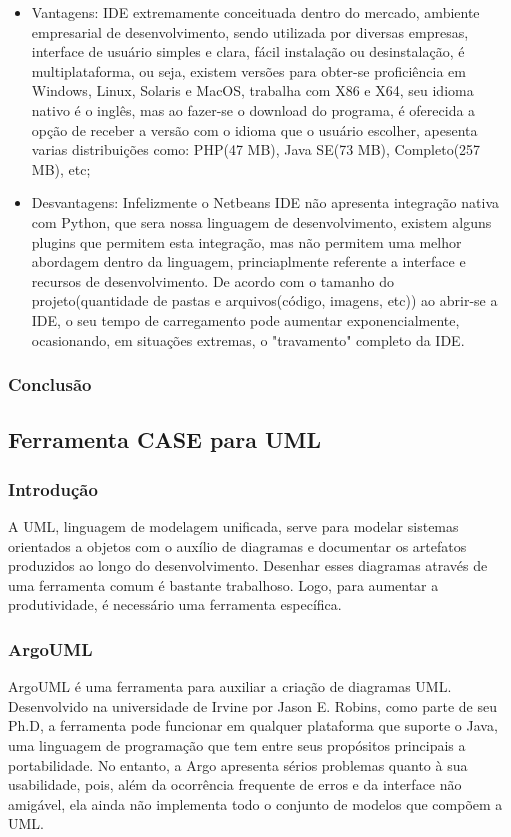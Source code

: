 \documentclass[12pt,a4paper]{article}
\begin{document}
			\begin{itemize}
				\item Vantagens:
				IDE extremamente conceituada dentro do mercado, ambiente empresarial de desenvolvimento, sendo utilizada por diversas empresas, interface de usuário simples e clara, fácil instalação ou desinstalação, é multiplataforma, ou seja, existem versões para obter-se proficiência em Windows, Linux, Solaris e MacOS, trabalha com X86 e X64, seu idioma nativo é o inglês, mas ao fazer-se o download do programa, é oferecida a opção de receber a versão com o idioma que o usuário escolher, apesenta varias distribuições como: PHP(47 MB), Java SE(73 MB), Completo(257 MB), etc;
				\item Desvantagens:
				 Infelizmente o Netbeans IDE não apresenta integração nativa com Python, que sera nossa linguagem de desenvolvimento, existem alguns plugins que permitem esta integração, mas não permitem uma melhor abordagem dentro da linguagem, princiaplmente referente a interface e recursos de desenvolvimento. 
				 De acordo com o tamanho do projeto(quantidade de pastas e arquivos(código, imagens, etc)) ao abrir-se a IDE, o seu tempo de carregamento pode aumentar exponencialmente, ocasionando, em situações extremas, o "travamento" completo da IDE.
			\end{itemize}
		
		\subsubsection{Conclusão}

	\clearpage
	\subsection{Ferramenta CASE para UML}
		\subsubsection{Introdução}
			A UML, linguagem de modelagem unificada, serve para modelar sistemas orientados
			a objetos com o auxílio de diagramas e documentar os artefatos
			produzidos ao longo do desenvolvimento. Desenhar esses diagramas através de uma ferramenta
			comum é bastante trabalhoso. Logo, para aumentar a produtividade, é necessário
			uma ferramenta específica.
		\subsubsection{ArgoUML}
			ArgoUML é uma ferramenta para auxiliar a criação de diagramas UML. Desenvolvido
			na universidade de Irvine por Jason E. Robins, como parte de seu Ph.D, a ferramenta
			pode funcionar em qualquer plataforma que suporte o Java, uma linguagem de 
			programação que tem entre seus propósitos principais a portabilidade.
			No entanto, a Argo apresenta sérios problemas quanto à sua usabilidade, pois,
			além da ocorrência frequente de erros e da interface não amigável, ela ainda não
			implementa todo o conjunto de modelos que compõem a UML.
\end{document}
